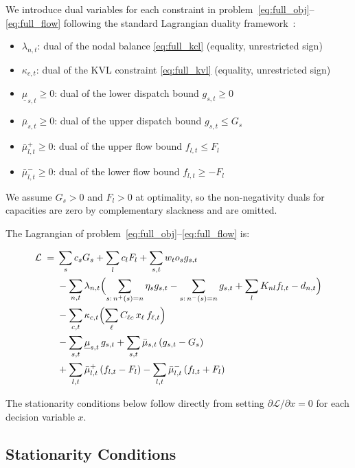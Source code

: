 \documentclass{article}
\begin{document}
We introduce dual variables for each constraint in problem~\eqref{eq:full_obj}--\eqref{eq:full_flow}
following the standard Lagrangian duality framework~\cite{Boyd2004,Bertsekas2016}:
\begin{itemize}
    \item $\lambda_{n,t}$: dual of the nodal balance \eqref{eq:full_kcl} (equality,
          unrestricted sign)
    \item $\kappa_{c,t}$: dual of the KVL constraint \eqref{eq:full_kvl} (equality,
          unrestricted sign)
    \item $\underline{\mu}_{s,t} \ge 0$: dual of the lower dispatch bound $g_{s,t} \ge 0$
    \item $\bar{\mu}_{s,t} \ge 0$: dual of the upper dispatch bound $g_{s,t} \le G_s$
    \item $\bar{\mu}^+_{l,t} \ge 0$: dual of the upper flow bound $f_{l,t} \le F_l$
    \item $\bar{\mu}^-_{l,t} \ge 0$: dual of the lower flow bound $f_{l,t} \ge -F_l$
\end{itemize}

We assume $G_s > 0$ and $F_l > 0$ at optimality, so the non-negativity
duals for capacities are zero by complementary slackness and are omitted.

The Lagrangian of problem~\eqref{eq:full_obj}--\eqref{eq:full_flow} is:

\begin{align}
\mathcal{L} \;=\;&
    \sum_s c_s G_s + \sum_l c_l F_l + \sum_{s,t} w_t o_s g_{s,t}
    \notag \\
&- \sum_{n,t} \lambda_{n,t}
    \Bigl(
      \sum_{s:\,n^+(s)=n} \eta_s g_{s,t}
      - \sum_{s:\,n^-(s)=n} g_{s,t}
      + \sum_l K_{nl} f_{l,t}
      - d_{n,t}
    \Bigr)
    \notag \\
&- \sum_{c,t} \kappa_{c,t}
    \Bigl(\sum_\ell C_{\ell c}\, x_\ell\, f_{\ell,t}\Bigr)
    \notag \\
&- \sum_{s,t} \underline{\mu}_{s,t}\, g_{s,t}
 + \sum_{s,t} \bar{\mu}_{s,t}\,(g_{s,t} - G_s)
    \notag \\
&+ \sum_{l,t} \bar{\mu}^+_{l,t}\,(f_{l,t} - F_l)
 - \sum_{l,t} \bar{\mu}^-_{l,t}\,(f_{l,t} + F_l)
    \label{eq:lagrangian}
\end{align}

The stationarity conditions below follow directly from setting
$\partial\mathcal{L}/\partial x = 0$ for each decision variable $x$.

\subsection{Stationarity Conditions}
\end{document}
